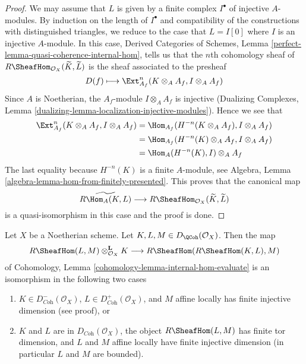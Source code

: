\begin{proof}
We may assume that $L$ is given by a finite complex $I^\bullet$
of injective $A$-modules. By induction on the length of $I^\bullet$
and compatibility of the constructions with distinguished triangles,
we reduce to the case that $L = I[0]$ where $I$ is an injective $A$-module.
In this case, Derived Categories of Schemes, Lemma
\ref{perfect-lemma-quasi-coherence-internal-hom}, tells us that
the $n$th cohomology sheaf of
$R\SheafHom_{\mathcal{O}_X}(\widetilde{K}, \widetilde{L})$
is the sheaf associated to the presheaf
$$
D(f) \longmapsto \Ext^n_{A_f}(K \otimes_A A_f, I \otimes_A A_f)
$$
Since $A$ is Noetherian, the $A_f$-module $I \otimes_A A_f$ is injective
(Dualizing Complexes, Lemma
\ref{dualizing-lemma-localization-injective-modules}). Hence we see that
\begin{align*}
\Ext^n_{A_f}(K \otimes_A A_f, I \otimes_A A_f)
& =
\Hom_{A_f}(H^{-n}(K \otimes_A A_f), I \otimes_A A_f) \\
& =
\Hom_{A_f}(H^{-n}(K) \otimes_A A_f, I \otimes_A A_f) \\
& =
\Hom_A(H^{-n}(K), I) \otimes_A A_f
\end{align*}
The last equality because $H^{-n}(K)$ is a finite $A$-module, see
Algebra, Lemma \ref{algebra-lemma-hom-from-finitely-presented}.
This proves that the canonical map
$$
\widetilde{R\Hom_A(K, L)}
\longrightarrow
R\SheafHom_{\mathcal{O}_X}(\widetilde{K}, \widetilde{L})
$$
is a quasi-isomorphism in this case and the proof is done.
\end{proof}

\begin{lemma}
\label{lemma-internal-hom-evaluate-isom}
Let $X$ be a Noetherian scheme. Let $K, L, M \in D_\QCoh(\mathcal{O}_X)$. 
Then the map
$$
R\SheafHom(L, M) \otimes_{\mathcal{O}_X}^\mathbf{L} K
\longrightarrow
R\SheafHom(R\SheafHom(K, L), M)
$$
of Cohomology, Lemma \ref{cohomology-lemma-internal-hom-evaluate}
is an isomorphism in the following two cases
\begin{enumerate}
\item $K \in D^-_{\textit{Coh}}(\mathcal{O}_X)$,
$L \in D^+_{\textit{Coh}}(\mathcal{O}_X)$, and $M$ affine locally has
finite injective dimension (see proof), or
\item $K$ and $L$ are in $D_{\textit{Coh}}(\mathcal{O}_X)$,
the object $R\SheafHom(L, M)$ has finite tor dimension, and
$L$ and $M$ affine locally have finite injective dimension
(in particular $L$ and $M$ are bounded).
\end{enumerate}
\end{lemma}

